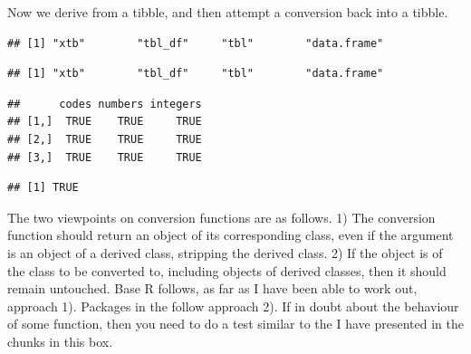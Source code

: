 \documentclass[krantz2,ChapterTOCs]{krantz}\usepackage{knitr}
\begin{document}
\begin{explainbox}
Now we derive from a tibble, and then attempt a conversion back into a tibble.

\begin{knitrout}\footnotesize
{}\color{fgcolor}\begin{kframe}
\begin{alltt}
 \hlkwb{<-} 
 \hlkwb{<-} \hlstd{(}\hlstd{,} 
\end{alltt}
\begin{verbatim}
## [1] "xtb"        "tbl_df"     "tbl"        "data.frame"
\end{verbatim}
\begin{alltt}
 \hlkwb{<-} 
\end{alltt}
\begin{verbatim}
## [1] "xtb"        "tbl_df"     "tbl"        "data.frame"
\end{verbatim}
\begin{alltt}
 \hlopt{==} 
\end{alltt}
\begin{verbatim}
##      codes numbers integers
## [1,]  TRUE    TRUE     TRUE
## [2,]  TRUE    TRUE     TRUE
## [3,]  TRUE    TRUE     TRUE
\end{verbatim}
\begin{alltt}
\end{alltt}
\begin{verbatim}
## [1] TRUE
\end{verbatim}
\end{kframe}
\end{knitrout}

The two viewpoints on conversion functions are as follows. 1) The conversion function should return an object of its corresponding class, even if the argument is an object of a derived class, stripping the derived class. 2) If the object is of the class to be converted to, including objects of derived classes, then it should remain untouched. Base R follows, as far as I have been able to work out, approach 1). Packages in the  follow approach 2). If in doubt about the behaviour of some function, then you need to do a test similar to the I have presented in the chunks in this box.
\end{explainbox}
\end{document}

